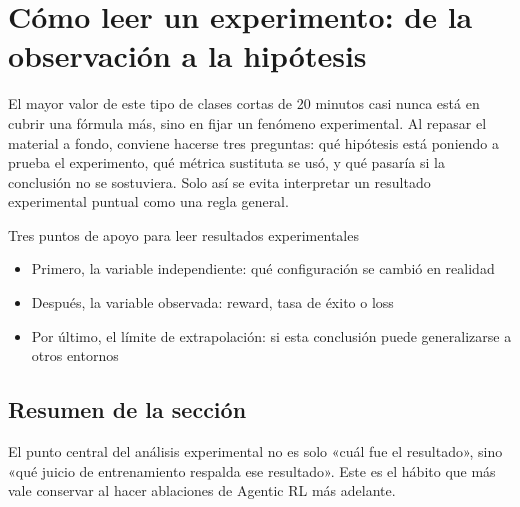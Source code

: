 \section{Cómo leer un experimento: de la observación a la hipótesis}
El mayor valor de este tipo de clases cortas de 20 minutos casi nunca está en cubrir una fórmula más, sino en fijar un fenómeno experimental. Al repasar el material a fondo, conviene hacerse tres preguntas: qué hipótesis está poniendo a prueba el experimento, qué métrica sustituta se usó, y qué pasaría si la conclusión no se sostuviera. Solo así se evita interpretar un resultado experimental puntual como una regla general.

\begin{knowledgebox}{Tres puntos de apoyo para leer resultados experimentales}
\begin{itemize}
  \item Primero, la variable independiente: qué configuración se cambió en realidad
  \item Después, la variable observada: reward, tasa de éxito o loss
  \item Por último, el límite de extrapolación: si esta conclusión puede generalizarse a otros entornos
\end{itemize}
\end{knowledgebox}

\subsection{Resumen de la sección}
El punto central del análisis experimental no es solo «cuál fue el resultado», sino «qué juicio de entrenamiento respalda ese resultado». Este es el hábito que más vale conservar al hacer ablaciones de Agentic RL más adelante.

\newpage
